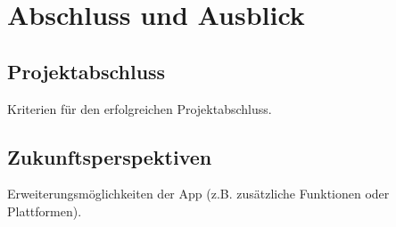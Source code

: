 \section{Abschluss und Ausblick}
\subsection{Projektabschluss}
Kriterien für den erfolgreichen Projektabschluss.

\subsection{Zukunftsperspektiven}
Erweiterungsmöglichkeiten der App (z.B. zusätzliche Funktionen oder Plattformen).